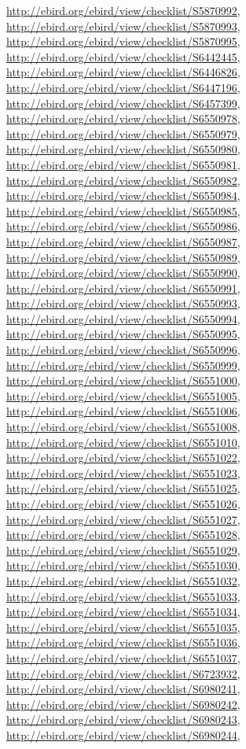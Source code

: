 \documentclass[9pt, article]{memoir}
\begin{document}
\begin{multicols}{2}
\url{http://ebird.org/ebird/view/checklist/S5870992}, 
\url{http://ebird.org/ebird/view/checklist/S5870993}, 
\url{http://ebird.org/ebird/view/checklist/S5870995}, 
\url{http://ebird.org/ebird/view/checklist/S6442445}, 
\url{http://ebird.org/ebird/view/checklist/S6446826}, 
\url{http://ebird.org/ebird/view/checklist/S6447196}, 
\url{http://ebird.org/ebird/view/checklist/S6457399}, 
\url{http://ebird.org/ebird/view/checklist/S6550978}, 
\url{http://ebird.org/ebird/view/checklist/S6550979}, 
\url{http://ebird.org/ebird/view/checklist/S6550980}, 
\url{http://ebird.org/ebird/view/checklist/S6550981}, 
\url{http://ebird.org/ebird/view/checklist/S6550982}, 
\url{http://ebird.org/ebird/view/checklist/S6550984}, 
\url{http://ebird.org/ebird/view/checklist/S6550985}, 
\url{http://ebird.org/ebird/view/checklist/S6550986}, 
\url{http://ebird.org/ebird/view/checklist/S6550987}, 
\url{http://ebird.org/ebird/view/checklist/S6550989}, 
\url{http://ebird.org/ebird/view/checklist/S6550990}, 
\url{http://ebird.org/ebird/view/checklist/S6550991}, 
\url{http://ebird.org/ebird/view/checklist/S6550993}, 
\url{http://ebird.org/ebird/view/checklist/S6550994}, 
\url{http://ebird.org/ebird/view/checklist/S6550995}, 
\url{http://ebird.org/ebird/view/checklist/S6550996}, 
\url{http://ebird.org/ebird/view/checklist/S6550999}, 
\url{http://ebird.org/ebird/view/checklist/S6551000}, 
\url{http://ebird.org/ebird/view/checklist/S6551005}, 
\url{http://ebird.org/ebird/view/checklist/S6551006}, 
\url{http://ebird.org/ebird/view/checklist/S6551008}, 
\url{http://ebird.org/ebird/view/checklist/S6551010}, 
\url{http://ebird.org/ebird/view/checklist/S6551022}, 
\url{http://ebird.org/ebird/view/checklist/S6551023}, 
\url{http://ebird.org/ebird/view/checklist/S6551025}, 
\url{http://ebird.org/ebird/view/checklist/S6551026}, 
\url{http://ebird.org/ebird/view/checklist/S6551027}, 
\url{http://ebird.org/ebird/view/checklist/S6551028}, 
\url{http://ebird.org/ebird/view/checklist/S6551029}, 
\url{http://ebird.org/ebird/view/checklist/S6551030}, 
\url{http://ebird.org/ebird/view/checklist/S6551032}, 
\url{http://ebird.org/ebird/view/checklist/S6551033}, 
\url{http://ebird.org/ebird/view/checklist/S6551034}, 
\url{http://ebird.org/ebird/view/checklist/S6551035}, 
\url{http://ebird.org/ebird/view/checklist/S6551036}, 
\url{http://ebird.org/ebird/view/checklist/S6551037}, 
\url{http://ebird.org/ebird/view/checklist/S6723932}, 
\url{http://ebird.org/ebird/view/checklist/S6980241}, 
\url{http://ebird.org/ebird/view/checklist/S6980242}, 
\url{http://ebird.org/ebird/view/checklist/S6980243}, 
\url{http://ebird.org/ebird/view/checklist/S6980244}, 

\end{multicols}
\end{document}
